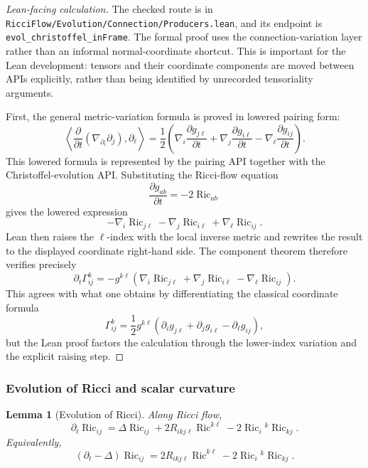 \documentclass[11pt]{article}
\theoremstyle{plain}
\newtheorem{lemma}[theorem]{Lemma}
\theoremstyle{definition}
\theoremstyle{remark}
\newcommand{\Ric}{\operatorname{Ric}}
\newcommand{\leanref}[1]{\nolinkurl{#1}}
\newcommand{\leanfile}[1]{\nolinkurl{#1}}
\newcommand{\rffile}[1]{\leanfile{#1}}
\begin{document}
\begin{proof}[Lean-facing calculation]
The checked route is in \rffile{RicciFlow/Evolution/Connection/Producers.lean},
and its endpoint is \leanref{evol_christoffel_inFrame}.  The formal proof uses
the connection-variation layer rather than an informal normal-coordinate
shortcut.  This is important for the Lean development: tensors and their
coordinate components are moved between APIs explicitly, rather than being
identified by unrecorded tensoriality arguments.

First, the general metric-variation formula is proved in lowered pairing form:
\[
  \left\langle
    \frac{\partial}{\partial t}(\nabla_{\partial_i}\partial_j),\partial_\ell
  \right\rangle
  =
  \frac12\left(
    \nabla_i\frac{\partial g_{j\ell}}{\partial t}
    +\nabla_j\frac{\partial g_{i\ell}}{\partial t}
    -\nabla_\ell\frac{\partial g_{ij}}{\partial t}
  \right).
\]
This lowered formula is represented by the pairing API together with the
Christoffel-evolution API.  Substituting the Ricci-flow equation
\[
  \frac{\partial g_{ab}}{\partial t}=-2\Ric_{ab}
\]
gives the lowered expression
\[
  -\nabla_i\Ric_{j\ell}
  -\nabla_j\Ric_{i\ell}
  +\nabla_\ell\Ric_{ij}.
\]
Lean then raises the \(\ell\)-index with the local inverse metric and rewrites
the result to the displayed coordinate right-hand side.  The component theorem
therefore verifies precisely
\[
  \partial_t\Gamma^k_{ij}
  =
  -g^{k\ell}
  \left(
    \nabla_i\Ric_{j\ell}
    +\nabla_j\Ric_{i\ell}
    -\nabla_\ell\Ric_{ij}
  \right).
\]
This agrees with what one obtains by differentiating the classical coordinate
formula
\[
  \Gamma^k_{ij}
  =
  \frac12g^{k\ell}
  \left(
    \partial_ig_{j\ell}
    +\partial_jg_{i\ell}
    -\partial_\ell g_{ij}
  \right),
\]
but the Lean proof factors the calculation through the lower-index variation
and the explicit raising step.
\end{proof}

\subsubsection{Evolution of Ricci and scalar curvature}

\begin{lemma}[Evolution of Ricci]
\label{lem:evol-ricci}
Along Ricci flow,
\[
\partial_t\Ric_{ij}
=
\Delta\Ric_{ij}
+2R_{ikj\ell}\Ric^{k\ell}
-2\Ric_i{}^k\Ric_{kj}.
\]
Equivalently,
\[
(\partial_t-\Delta)\Ric_{ij}
=
2R_{ikj\ell}\Ric^{k\ell}
-2\Ric_i{}^k\Ric_{kj}.
\]
\end{lemma}
\end{document}
